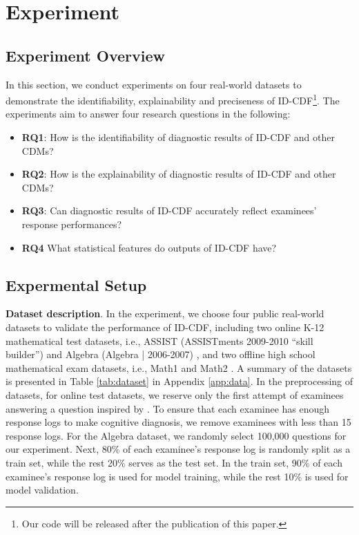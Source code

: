 \documentclass[sigconf]{acmart}
\begin{document}
\vspace{-5pt}
\section{Experiment}\label{sec:exp}

\subsection{Experiment Overview}
\par In this section, we conduct experiments on four real-world datasets to demonstrate the identifiability, explainability and preciseness of ID-CDF\footnote{Our code will be released after the publication of this paper.}. The experiments aim to answer four research questions in the following:

\begin{itemize}[leftmargin=*]
  \item \textbf{RQ1}: How is the identifiability of diagnostic results of ID-CDF and other CDMs?
  \item \textbf{RQ2}: How is the explainability of diagnostic results of ID-CDF and other CDMs?
  \item \textbf{RQ3}: Can diagnostic results of ID-CDF accurately reflect examinees' response performances?
  \item \textbf{RQ4} What statistical features do outputs of ID-CDF have?
\end{itemize}


\vspace{-10pt}
\subsection{Expermental Setup}\label{sec:exp-setup}
\par \textbf{Dataset description}. In the experiment, we choose four public real-world datasets to validate the performance of ID-CDF, including two online K-12 mathematical test datasets, i.e., ASSIST (ASSISTments 2009-2010 ``skill builder'') \cite{Feng2009} and Algebra (Algebra | 2006-2007) \cite{Stamper2010}, and two offline high school mathematical exam datasets, i.e., Math1 and Math2 \cite{Liu2018}. A summary of the datasets is presented in Table \ref{tab:dataset} in Appendix \ref{app:data}. In the preprocessing of datasets, for online test datasets, we reserve only the first attempt of examinees answering a question inspired by \cite{Huang2019}. To ensure that each examinee has enough response logs to make cognitive diagnosis, we remove examinees with less than 15 response logs. For the Algebra dataset, we randomly select 100,000 questions for our experiment. Next, 80\% of each examinee's response log is randomly split as a train set, while the rest 20\% serves as the test set. In the train set, 90\% of each examinee's response log is used for model training, while the rest 10\% is used for model validation.
\end{document}
